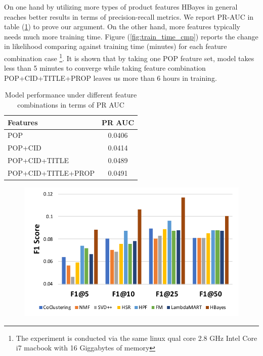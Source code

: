 On one hand by utilizing more types of product features HBayes in general reaches better results in terms of precision-recall metrics.  We report PR-AUC in table (\ref{tab:features_cmp}) to prove our argument.   On the other hand, more features typically needs much more training time.  Figure (\ref{fig:train_time_cmp}) reports the change in likelihood comparing against training time (minutes) for each feature combination case \footnote{The experiment is conducted via the same linux qual core 2.8 GHz Intel Core i7 macbook with 16 Giggabytes of memory}.   It is shown that by taking one POP feature set, model takes less than 5 minutes to converge while taking feature combination POP+CID+TITLE+PROP leaves us more than 6 hours in training.   

\begin{table}[htb]
\centering
\begin{tabular}{l|c}
\toprule
\textbf{Features} & \textbf{PR AUC} \\
\hline
POP & 0.0406 \\
\rowcolor{mygray}
POP+CID & 0.0414 \\
POP+CID+TITLE & 0.0489 \\
\rowcolor{mygray}
POP+CID+TITLE+PROP & 0.0491 \\
\bottomrule
\end{tabular}
\caption{Model performance under different feature combinations in terms of PR AUC}
\label{tab:features_cmp}
\end{table}

\begin{figure}[!htb]
\includegraphics[width=0.7\linewidth]{fig/legend}
\end{figure}

